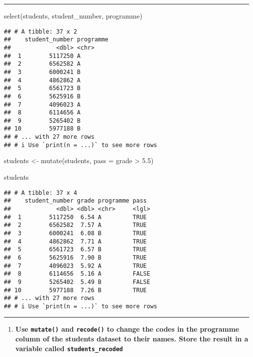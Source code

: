\documentclass[
]{article}
\newenvironment{Shaded}{\begin{snugshade}}{\end{snugshade}}
\newcommand{\AttributeTok}[1]{\textcolor[rgb]{0.77,0.63,0.00}{#1}}
\newcommand{\FloatTok}[1]{\textcolor[rgb]{0.00,0.00,0.81}{#1}}
\newcommand{\FunctionTok}[1]{\textcolor[rgb]{0.00,0.00,0.00}{#1}}
\newcommand{\NormalTok}[1]{#1}
\newcommand{\OtherTok}[1]{\textcolor[rgb]{0.56,0.35,0.01}{#1}}
\newcommand{\SpecialCharTok}[1]{\textcolor[rgb]{0.00,0.00,0.00}{#1}}
\providecommand{\tightlist}{%
  \setlength{\itemsep}{0pt}\setlength{\parskip}{0pt}}
\begin{document}
\begin{center}\rule{0.5\linewidth}{0.5pt}\end{center}

\begin{Shaded}
\begin{Highlighting}[]
\FunctionTok{select}\NormalTok{(students, student\_number, programme)}
\end{Highlighting}
\end{Shaded}

\begin{verbatim}
## # A tibble: 37 x 2
##    student_number programme
##             <dbl> <chr>    
##  1        5117250 A        
##  2        6562582 A        
##  3        6000241 B        
##  4        4862862 A        
##  5        6561723 B        
##  6        5625916 B        
##  7        4096023 A        
##  8        6114656 A        
##  9        5265402 B        
## 10        5977188 B        
## # ... with 27 more rows
## # i Use `print(n = ...)` to see more rows
\end{verbatim}

\begin{Shaded}
\begin{Highlighting}[]
\NormalTok{students }\OtherTok{\textless{}{-}} \FunctionTok{mutate}\NormalTok{(students, }\AttributeTok{pass =}\NormalTok{ grade }\SpecialCharTok{\textgreater{}} \FloatTok{5.5}\NormalTok{)}

\NormalTok{students}
\end{Highlighting}
\end{Shaded}

\begin{verbatim}
## # A tibble: 37 x 4
##    student_number grade programme pass 
##             <dbl> <dbl> <chr>     <lgl>
##  1        5117250  6.54 A         TRUE 
##  2        6562582  7.57 A         TRUE 
##  3        6000241  6.08 B         TRUE 
##  4        4862862  7.71 A         TRUE 
##  5        6561723  6.57 B         TRUE 
##  6        5625916  7.90 B         TRUE 
##  7        4096023  5.92 A         TRUE 
##  8        6114656  5.16 A         FALSE
##  9        5265402  5.49 B         FALSE
## 10        5977188  7.26 B         TRUE 
## # ... with 27 more rows
## # i Use `print(n = ...)` to see more rows
\end{verbatim}

\begin{center}\rule{0.5\linewidth}{0.5pt}\end{center}

\begin{enumerate}
\def\labelenumi{\arabic{enumi}.}
\setcounter{enumi}{14}
\tightlist
\item
  \textbf{Use \texttt{mutate()} and \texttt{recode()} to change the
  codes in the programme column of the students dataset to their names.
  Store the result in a variable called \texttt{students\_recoded}}
\end{enumerate}
\end{document}
